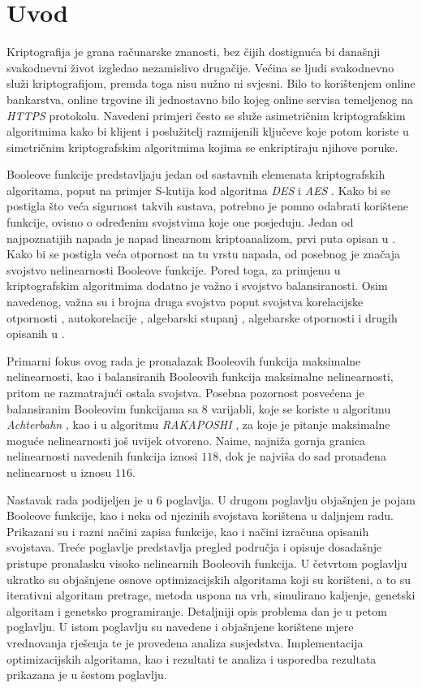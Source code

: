 \chapter{Uvod}
Kriptografija je grana računarske znanosti, bez čijih dostignuća bi današnji svakodnevni život izgledao nezamislivo drugačije.
Većina se ljudi svakodnevno služi kriptografijom, premda toga nisu nužno ni svjesni.
Bilo to korištenjem online bankarstva, online trgovine ili jednostavno bilo kojeg online servisa temeljenog na \textit{HTTPS} protokolu.
Navedeni primjeri često se služe asimetričnim kriptografskim algoritmima kako bi klijent i poslužitelj razmijenili ključeve koje potom koriste u simetričnim kriptografskim algoritmima kojima se enkriptiraju njihove poruke.

Booleove funkcije predstavljaju jedan od sastavnih elemenata kriptografskih algoritama, poput na primjer S-kutija kod algoritma \textit{DES} i \textit{AES} \cite{daemen1999aes}.
Kako bi se postigla što veća sigurnost takvih sustava, potrebno je pomno odabrati korištene funkcije, ovisno o određenim svojstvima koje one posjeduju.
Jedan od najpoznatijih napada je napad linearnom kriptoanalizom, prvi puta opisan u \cite{golic1994linear}.
Kako bi se postigla veća otpornost na tu vrstu napada, od posebnog je značaja svojstvo nelinearnosti Booleove funkcije.
Pored toga, za primjenu u kriptografskim algoritmima dodatno je važno i svojstvo balansiranosti.
Osim navedenog, važna su i brojna druga svojstva poput svojstva korelacijske otpornosti , autokorelacije , algebarski stupanj , algebarske otpornosti  i drugih opisanih u \cite{CryptographicBooleanFunctions}.

Primarni fokus ovog rada je pronalazak Booleovih funkcija maksimalne nelinearnosti, kao i balansiranih Booleovih funkcija maksimalne nelinearnosti, pritom ne razmatrajući ostala svojstva.
Posebna pozornost posvećena je balansiranim Booleovim funkcijama sa $8$ varijabli, koje se koriste u algoritmu \textit{Achterbahn} \cite{gammel2005achterbahn}, kao i u algoritmu \textit{RAKAPOSHI} \cite{cid2009rakaposhi}, za koje je pitanje maksimalne moguće nelinearnosti još uvijek otvoreno.
Naime, najniža gornja granica nelinearnosti navedenih funkcija iznosi $118$, dok je najviša do sad pronađena nelinearnost u iznosu $116$.

Nastavak rada podijeljen je u $6$ poglavlja.
U drugom poglavlju objašnjen je pojam Booleove funkcije, kao i neka od njezinih svojstava korištena u daljnjem radu.
Prikazani su i razni načini zapisa funkcije, kao i načini izračuna opisanih svojstava.
Treće poglavlje predstavlja pregled područja i opisuje dosadašnje pristupe pronalasku visoko nelinearnih Booleovih funkcija.
U četvrtom poglavlju ukratko su objašnjene osnove optimizacijskih algoritama koji su korišteni, a to su iterativni algoritam pretrage, metoda uspona na vrh, simulirano kaljenje, genetski algoritam i genetsko programiranje.
Detaljniji opis problema dan je u petom poglavlju.
U istom poglavlju su navedene i objašnjene korištene mjere vrednovanja rješenja te je provedena analiza susjedstva.
Implementacija optimizacijskih algoritama, kao i rezultati te analiza i usporedba rezultata prikazana je u šestom poglavlju. 